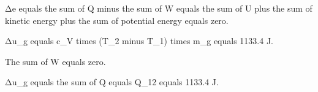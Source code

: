 Δe equals the sum of Q minus the sum of W equals the sum of U plus the sum of kinetic energy plus the sum of potential energy equals zero.  

Δu_g equals c_V times (T_2 minus T_1) times m_g equals 1133.4 J.  

The sum of W equals zero.  

Δu_g equals the sum of Q equals Q_12 equals 1133.4 J.
